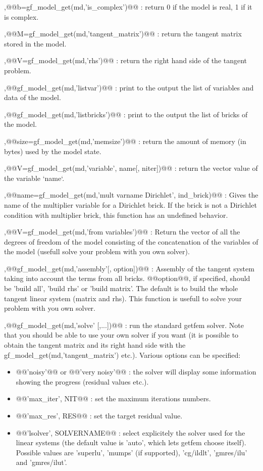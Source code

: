 \begin{cmddescription}
\sep{@@b=gf_model_get(md,'is_complex')@@} :
return 0 if the model  is real, 1 if it is complex.

\sep{@@M=gf_model_get(md,'tangent_matrix')@@} :
return the tangent matrix stored in the model.

\sep{@@V=gf_model_get(md,'rhs')@@} :
return the right hand side of the tangent problem.

\sep{@@gf_model_get(md,'listvar')@@} :
print to the output the list of variables and data of the model.

\sep{@@gf_model_get(md,'listbricks')@@} :
print to the output the list of bricks of the model.

\sep{@@size=gf_model_get(md,'memsize')@@} :
return the amount of memory (in bytes) used by the model state.

\sep{@@V=gf_model_get(md,'variable', \tstr name[, \tint niter])@@} :
return the vector value of the variable `name`. 

\sep{@@name=gf_model_get(md,'mult varname Dirichlet', \tint ind_brick)@@} :
Gives the name of the multiplier variable for a Dirichlet brick.
If the brick is not a Dirichlet condition with multiplier brick,
this function has an undefined behavior.

\sep{@@V=gf_model_get(md,'from variables')@@} :
Return the vector of all the degrees of freedom of the model consisting
of the concatenation of the variables of the model (usefull
solve your problem with you own solver).

\sep{@@gf_model_get(md,'assembly'[, \tstr option])@@} :
Assembly of the tangent system taking into account the terms
from all bricks. @@option@@, if specified, should be 'build all',
'build rhs' or 'build matrix'. The default is to build the whole
tangent linear system (matrix and rhs). This function is usefull to solve
your problem with you own solver.

\sep{@@gf_model_get(md,'solve' [,...])@@} :
run the standard getfem solver.  Note that you should be able to use your own
solver if you want (it is possible to obtain the tangent matrix and its right
hand side with the gf_model_get(md,'tangent_matrix') etc.).   Various
options can be specified:
\begin{itemize}
\item @@'noisy'@@ or @@'very noisy'@@ : the solver will display
  some information showing the progress (residual values etc.). 
\item @@'max_iter', NIT@@ : set the maximum iterations numbers. 
\item @@'max_res', RES@@ :
  set the target residual value.
\item @@'lsolver', SOLVERNAME@@  : select explicitely
  the solver used for the linear systems (the default value is 'auto', which
  lets getfem choose itself). Possible values are 'superlu', 'mumps' (if
  supported), 'cg/ildlt', 'gmres/ilu' and 'gmres/ilut'.
\end{itemize}


\end{cmddescription}
